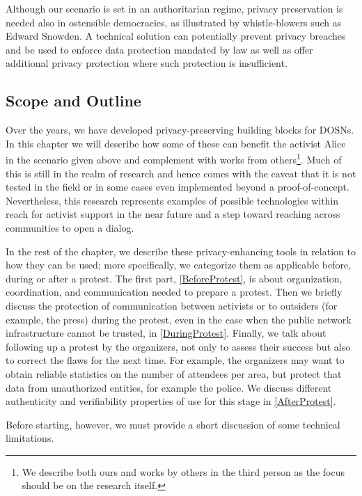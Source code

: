 Although our scenario is set in an authoritarian regime, privacy
preservation is needed also in ostensible democracies, as illustrated
by whistle-blowers such as Edward Snowden. 
A technical solution can potentially prevent privacy breaches and be
used to enforce data protection mandated by law as well as offer
additional privacy protection where such protection is insufficient.



\subsection{Scope and Outline}
\label{Outline}

Over the years, we have developed privacy-preserving building blocks
for \acp{DOSN}.  In this chapter we will describe how some of these
can benefit the activist Alice in the scenario given above and
complement with works from others\footnote{We describe both ours and
  works by others in the third person as the focus should be on the
  research itself.}. Much of this is still in the realm of research
and hence comes with the caveat that it is not tested in the field or
in some cases even implemented beyond a
proof-of-concept. Nevertheless, this research represents examples of
possible technologies within reach for activist support in the near
future and a step toward reaching across communities to open a dialog.

In the rest of the chapter, we describe these privacy-enhancing tools
in relation to how they can be used; more specifically, we categorize
them as applicable before, during or after a protest. The first part,
\cref{BeforeProtest}, is about organization, coordination, and
communication needed to prepare a protest.  Then we briefly discuss
the protection of communication between activists or to outsiders (for example, the
press) during the protest, even in the case when the public network
infrastructure cannot be trusted, in \cref{DuringProtest}.
    Finally, we talk about following up a protest by the organizers, not only to assess their success 
    but also to correct the flaws for the next time.  For example, the 
    organizers may want to obtain reliable statistics on the number of 
    attendees per area, but protect that data from unauthorized
    entities, for example the police.
    We discuss different authenticity and verifiability properties of use for 
    this stage in \cref{AfterProtest}.


Before starting, however, we must provide a short discussion of some technical 
limitations.
